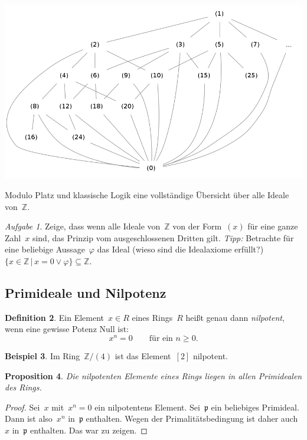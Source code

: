 \documentclass[a4paper,ngerman,12pt]{scrartcl}
\theoremstyle{definition}
\newtheorem{defn}{Definition}[section]
\newtheorem{bsp}[defn]{Beispiel}
\theoremstyle{plain}
\newtheorem{prop}[defn]{Proposition}
\theoremstyle{remark}
\newtheorem{aufg}[defn]{Aufgabe}
\newcommand{\ZZ}{\mathbb{Z}}
\newcommand{\pp}{\mathfrak{p}}
\renewcommand{\_}{\mathpunct{.}\,}
\newcommand{\?}{\,{:}\,}
\begin{document}
\begin{table}
  \centering
  \includegraphics[scale=0.4]{ideale-z}
  \caption{\label{ideale:z}Modulo Platz und klassische Logik eine
  vollständige Übersicht über alle Ideale von~$\ZZ$.}
\end{table}

\begin{aufg}Zeige, dass wenn alle Ideale von~$\ZZ$ von der Form~$(x)$ für
eine ganze Zahl~$x$ sind, das Prinzip vom ausgeschlossenen Dritten gilt.
\emph{Tipp:} Betrachte für eine beliebige Aussage~$\varphi$ das Ideal (wieso
sind die Idealaxiome erfüllt?) $\{ x \in \ZZ
\,|\, x = 0 \vee \varphi \} \subseteq \ZZ$.\end{aufg}


\subsection{Primideale und Nilpotenz}

\begin{defn}Ein Element~$x \in R$ eines Rings~$R$ heißt genau dann
\emph{nilpotent}, wenn eine gewisse Potenz Null ist:
\[ x^n = 0 \qquad\text{für ein~$n \geq 0$}. \]
\end{defn}

\begin{bsp}Im Ring~$\ZZ/(4)$ ist das Element~$[2]$ nilpotent.\end{bsp}

\begin{prop}Die nilpotenten Elemente eines Rings liegen in allen Primidealen
des Rings.\end{prop}
\begin{proof}Sei~$x$ mit~$x^n = 0$ ein nilpotentens Element. Sei~$\pp$ ein
beliebiges Primideal. Dann ist also~$x^n$ in~$\pp$ enthalten. Wegen der
Primalitätsbedingung ist daher auch~$x$ in~$\pp$ enthalten. Das war zu
zeigen.\end{proof}
\end{document}
